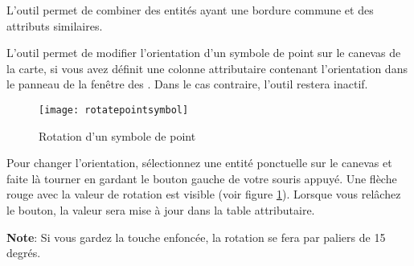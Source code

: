 L'outil  permet de combiner des entités ayant une bordure commune et des attributs similaires.



L'outil  permet de modifier l'orientation d'un symbole de point sur le canevas de la carte, si vous avez définit une colonne attributaire contenant l'orientation dans le panneau  de la fenêtre des . Dans le cas contraire, l'outil restera inactif.

\begin{figure}[ht]
   \centering
   \texttt{[image: rotatepointsymbol]}
   \caption{Rotation d'un symbole de point \nixcaption}\label{fig:rotatepoint}
\end{figure}

Pour changer l'orientation, sélectionnez une entité ponctuelle sur le canevas et faite là tourner en gardant le bouton gauche de votre souris appuyé. Une flèche rouge avec la valeur de rotation est visible (voir figure \ref{fig:rotatepoint}). Lorsque vous relâchez le bouton, la valeur sera mise à jour dans la table attributaire.

\textbf{Note}: Si vous gardez la touche  enfoncée, la rotation se fera par paliers de 15 degrés.


